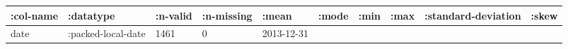 \documentclass[]{article}
\begin{document}
\begin{longtable}[]{@{}llllllllll@{}}
\toprule
\begin{minipage}[b]{0.08\columnwidth}\raggedright\strut
:col-name\strut
\end{minipage} & \begin{minipage}[b]{0.11\columnwidth}\raggedright\strut
:datatype\strut
\end{minipage} & \begin{minipage}[b]{0.06\columnwidth}\raggedright\strut
:n-valid\strut
\end{minipage} & \begin{minipage}[b]{0.07\columnwidth}\raggedright\strut
:n-missing\strut
\end{minipage} & \begin{minipage}[b]{0.07\columnwidth}\raggedright\strut
:mean\strut
\end{minipage} & \begin{minipage}[b]{0.04\columnwidth}\raggedright\strut
:mode\strut
\end{minipage} & \begin{minipage}[b]{0.07\columnwidth}\raggedright\strut
:min\strut
\end{minipage} & \begin{minipage}[b]{0.07\columnwidth}\raggedright\strut
:max\strut
\end{minipage} & \begin{minipage}[b]{0.12\columnwidth}\raggedright\strut
:standard-deviation\strut
\end{minipage} & \begin{minipage}[b]{0.05\columnwidth}\raggedright\strut
:skew\strut
\end{minipage}\tabularnewline
\midrule
\endhead
\begin{minipage}[t]{0.08\columnwidth}\raggedright\strut
date\strut
\end{minipage} & \begin{minipage}[t]{0.11\columnwidth}\raggedright\strut
:packed-local-date\strut
\end{minipage} & \begin{minipage}[t]{0.06\columnwidth}\raggedright\strut
1461\strut
\end{minipage} & \begin{minipage}[t]{0.07\columnwidth}\raggedright\strut
0\strut
\end{minipage} & \begin{minipage}[t]{0.07\columnwidth}\raggedright\strut
2013-12-31\strut
\end{minipage} & \begin{minipage}[t]{0.04\columnwidth}\raggedright\strut

\end{minipage}
\end{longtable}
\end{document}
